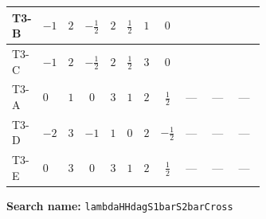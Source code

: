 \documentclass[8pt]{article}
\begin{document}
\begin{landscape}
\begin{longtable}{@{}llcccccc >{\raggedright\arraybackslash}p{0.21\linewidth} >{\raggedright\arraybackslash}p{0.21\linewidth} >{\raggedright\arraybackslash}p{0.21\linewidth}@{}}
T3-B & $-1$ & $2$ & $-\frac{1}{2}$ & $2$ & $\frac{1}{2}$ & $1$ & $0$ & \scriptsize\adjustbox{max width=\linewidth}{$\begin{gathered} +3 {\lambda_H} {\lambda_{H H^\dagger S_1^\dagger S_2^\dagger}^{\rm Cross}}\end{gathered}$} & \scriptsize\adjustbox{max width=\linewidth}{$\begin{gathered} +{\lambda_{H1}} (4 {\lambda_{H H^\dagger S_1^\dagger S_2^\dagger}^{\rm Cross}}+3 {\lambda_{S_1 S_1^{\dagger 2}S_2^\dagger}})\end{gathered}$} & \scriptsize\adjustbox{max width=\linewidth}{$\begin{gathered} +{\lambda_{H1}^{\rm Adj}} \left(-\frac{{\lambda_{H H^\dagger S_1^\dagger S_2^\dagger}^{\rm Cross}}}{2}-\frac{{\lambda_{S_1 S_1^{\dagger 2}S_2^\dagger}}}{4}\right)\end{gathered}$} \\
\midrule
T3-C & $-1$ & $2$ & $-\frac{1}{2}$ & $2$ & $\frac{1}{2}$ & $3$ & $0$ & \scriptsize\adjustbox{max width=\linewidth}{$\begin{gathered} +3 {\lambda_H} {\lambda_{H H^\dagger S_1^\dagger S_2^\dagger}^{\rm Cross}}\end{gathered}$} & \scriptsize\adjustbox{max width=\linewidth}{$\begin{gathered} +{\lambda_{H1}} (4 {\lambda_{H H^\dagger S_1^\dagger S_2^\dagger}^{\rm Cross}}+3 {\lambda_{S_1 S_1^{\dagger 2}S_2^\dagger}})\end{gathered}$} & \scriptsize\adjustbox{max width=\linewidth}{$\begin{gathered} +{\lambda_{H1}^{\rm Adj}} \left(-\frac{{\lambda_{H H^\dagger S_1^\dagger S_2^\dagger}^{\rm Cross}}}{2}-\frac{{\lambda_{S_1 S_1^{\dagger 2}S_2^\dagger}}}{4}\right)\end{gathered}$} \\
\midrule
T3-A & $0$ & $1$ & $0$ & $3$ & $1$ & $2$ & $\frac{1}{2}$ & --- & --- & --- \\
\midrule
T3-D & $-2$ & $3$ & $-1$ & $1$ & $0$ & $2$ & $-\frac{1}{2}$ & --- & --- & --- \\
\midrule
T3-E & $0$ & $3$ & $0$ & $3$ & $1$ & $2$ & $\frac{1}{2}$ & --- & --- & --- \\
\midrule
\bottomrule
\end{longtable}
\clearpage
\noindent\textbf{Search name: }\texttt{lambdaHHdagS1barS2barCross}\par\smallskip

\end{landscape}
\end{document}
